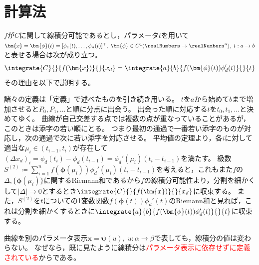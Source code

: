     \section{計算法}
        $f$が$C$に関して線積分可能であるとし，パラメータ$t$を用いて$\bm{x}=\bm{\phi}(t)=[\phi_1(t),\dotsc,\phi_n(t)]^\top,\; \bm{\phi} \in C^1(\realNumbers\to\realNumbers^n),\;t:a\to b$と表せる場合は次が成り立つ。
        \[ \integrate{C}{}{f(\bm{x})}{}{x_d} = \integrate{a}{b}{f(\bm{\phi}(t))\phi_d'(t)}{}{t} \]
        その理由を以下で説明する。
        \par
        諸々の定義は「定義」で述べたものを引き続き用いる。
        $t$を$a$から始めて$b$まで増加させると$P_0,P_1,\dotsc$と順に分点に出会う。
        出会った順に対応する$t$を$t_0,t_1,\dotsc$と決めてゆく。
        曲線が自己交差する点では複数の点が重なっていることがあるが，このときは添字の若い順にとる。
        つまり最初の通過で一番若い添字のものが対応し，次の通過で次に若い添字を対応させる。
        平均値の定理より，各$i$に対して適当な$\mu_i\in(t_{i-1},t_i)$が存在して$(\Delta x_d)_i = \phi_d(t_i) - \phi_d(t_{i-1}) = \phi_d'(\mu_i)(t_i-t_{i-1})$を満たす。
        級数$S^{(2)} \coloneq \sum_{i=1}^n f(\bm{\phi}(\mu_i))\phi_d'(\mu_i)(t_i-t_{i-1})$を考えると，これもまた$f$の$\Delta, \{\bm{\phi}(\mu_i)\}$に関するRiemann和であるから$f$の線積分可能性より，分割を細かくして$|\Delta|\to 0$とするとき$\integrate{C}{}{f(\bm{x})}{}{x_d}$に収束する。
        また，$S^{(2)}$を$t$についての1変数関数$f(\bm{\phi}(t))\phi_d'(t)$のRiemann和と見れば，これは分割を細かくするときに$\integrate{a}{b}{f(\bm{\phi}(t))\phi_d'(t)}{}{t}$に収束する。
        \newline
        \par
        曲線を別のパラメータ表示$\bm{x} = \bm{\psi}(u),\; u:\alpha\to\beta$で表しても，線積分の値は変わらない。
        なぜなら，既に見たように線積分は\textcolor{red}{パラメータ表示に依存せずに定義されている}からである。
